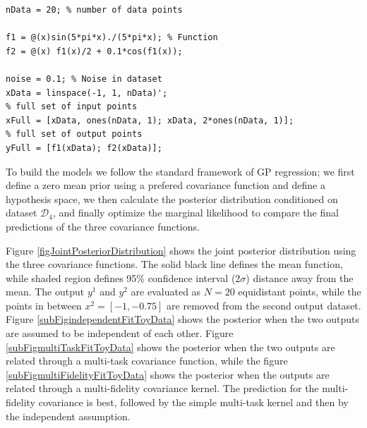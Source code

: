 \begin{mdframed}[hidealllines=true,backgroundcolor=lightgray!20]
\begin{lstlisting}[caption={Code for dataset D4}, 
                    captionpos=b,
                    label={codeDatasetD4},
                    style=Matlab-editor, 
                    basicstyle=\color{black}\ttfamily\small,
                    backgroundcolor = \color{MatlabCellColour}]
nData = 20; % number of data points

f1 = @(x)sin(5*pi*x)./(5*pi*x); % Function
f2 = @(x) f1(x)/2 + 0.1*cos(f1(x));

noise = 0.1; % Noise in dataset
xData = linspace(-1, 1, nData)';
% full set of input points
xFull = [xData, ones(nData, 1); xData, 2*ones(nData, 1)]; 
% full set of output points
yFull = [f1(xData); f2(xData)];
\end{lstlisting}
\end{mdframed}

\begin{mdframed}[hidealllines=true,backgroundcolor=lightgray!20]
To build the models we follow the standard framework of GP regression; we first define a zero mean prior using a prefered covariance function and define a hypothesis space, we then calculate the posterior distribution conditioned on dataset $\mathcal{D}_{4}$, and finally optimize the marginal likelihood to compare the final predictions of the three covariance functions. 

Figure \ref{figJointPosteriorDistribution} shows the joint posterior distribution using the three covariance functions. The solid black line defines the mean function, while shaded region defines 95\% confidence interval (2$\sigma$) distance away from the mean. The output $y^{1}$ and $y^2$ are evaluated as $N=20$ equidistant points, while the points in between $x^2 = [-1, -0.75]$ are removed from the second output dataset. Figure \ref{subFigindependentFitToyData} shows the posterior when the two outputs are assumed to be independent of each other. Figure \ref{subFigmultiTaskFitToyData} shows the posterior when the two outputs are related through a multi-task covariance function, while the figure \ref{subFigmultiFidelityFitToyData} shows the posterior when the outputs are related through a multi-fidelity covariance kernel. The prediction for the multi-fidelity covariance is best, followed by the simple multi-task kernel and then by the independent assumption.
\end{mdframed}

